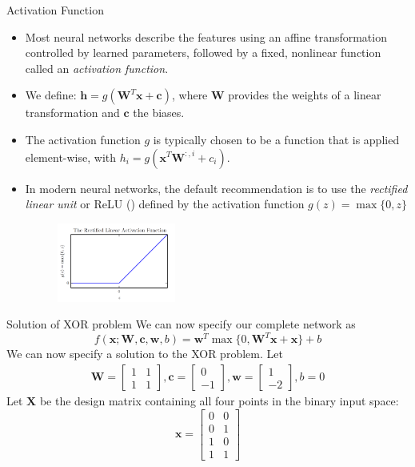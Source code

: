 \documentclass[10pt]{beamer}
\begin{document}
	\begin{frame}{Activation Function}
		\begin{itemize}
			\item Most neural networks describe the features using an affine transformation controlled by learned parameters, followed by a fixed, nonlinear function called an \emph{activation function}.
			\onslide<2->
			\item We define: $\bm{h}=g(\bm{W}^T\bm{x}+\bm{c})$, where $\bm{W}$ provides the weights of a linear transformation and $\bm{c}$ the biases.
			\onslide<3->
			\item The activation function $g$ is typically chosen to be a function that is applied element-wise, with $h_i=g(\bm{x}^T\bm{W}^{:,i}+c_i)$.
			\onslide<4->
			\item In modern neural networks, the default recommendation is to use the \emph{rectified linear unit} or ReLU (\citet{jarrett2009best,nair2010rectified,glorot2011deep}) defined by the activation function $g(z)=\max\{0,z\}$
			\begin{figure}
				\includegraphics<4->[height=7em]{figures/ReLU.png}
			\end{figure}
		\end{itemize}
	\end{frame}

	\begin{frame}{Solution of XOR problem}
		We can now specify our complete network as
		\begin{equation*}
			f(\bm{x};\bm{W},\bm{c},\bm{w},b)=\bm{w}^T\max\{0,\bm{W}^T\bm{x}+\bm{x}\}+b
		\end{equation*}
		\pause
		We can now specify a solution to the XOR problem. Let
		\begin{eqnarray*}
			\bm{W}=\begin{bmatrix}
			1&1\\
			1&1
			\end{bmatrix}, 
			\bm{c}=\begin{bmatrix}
				0\\
				-1
			\end{bmatrix},
			\bm{w}=\begin{bmatrix}
				1\\
				-2
			\end{bmatrix}, b=0
		\end{eqnarray*}
		\pause
		Let $\bm{X}$ be the design matrix containing all four points in the binary input space:
		$$\bm{x}=\begin{bmatrix}
		0&0\\
		0&1\\
		1&0\\
		1&1
		\end{bmatrix}$$
	\end{frame}
\end{document}
